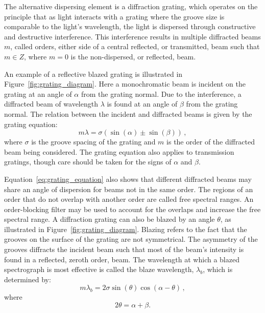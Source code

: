 The alternative dispersing element is a diffraction grating, which operates on the principle that as light interacts with a grating where the groove size is comparable to the light's wavelength, the light is dispersed through constructive and destructive interference. This interference results in multiple diffracted beams $m$, called orders, either side of a central reflected, or transmitted, beam such that $m \in Z$, where $m = 0$ is the non-dispersed, or reflected, beam.

An example of a reflective blazed grating is illustrated in Figure~\ref{fig:grating_diagram}. Here a monochromatic beam is incident on the grating at an angle of $\alpha$ from the grating normal. Due to the interference, a diffracted beam of wavelength $\lambda$ is found at an angle of $\beta$ from the grating normal. The relation between the incident and diffracted beams is given by the grating equation:
\begin{equation}
    m\lambda = \sigma (\sin(\alpha) \pm \sin(\beta))\,,\label{eq:grating_equation}
\end{equation}
where $\sigma$ is the groove spacing of the grating and $m$ is the order of the diffracted beam being considered. The grating equation also applies to transmission gratings, though care should be taken for the signs of $\alpha$ and $\beta$.


Equation~\ref{eq:grating_equation} also shows that different diffracted beams may share an angle of dispersion for beams not in the same order. The regions of an order that do not overlap with another order are called free spectral ranges. An order-blocking filter may be used to account for the overlaps and increase the free spectral range. A diffraction grating can also be blazed by an angle $\theta$, as illustrated in Figure~\ref{fig:grating_diagram}. Blazing refers to the fact that the grooves on the surface of the grating are not symmetrical. The asymmetry of the grooves diffracts the incident beam such that most of the beam's intensity is found in a reflected, zeroth order, beam. The wavelength at which a blazed spectrograph is most effective is called the blaze wavelength, $\lambda_{b}$, which is determined by:
\begin{equation}
    m\lambda_{b} = 2\sigma\sin(\theta)\cos(\alpha - \theta)\,,\label{eq:blaze_wavelength}
\end{equation}
where
\begin{equation}
    2\theta = \alpha + \beta.
\end{equation}

